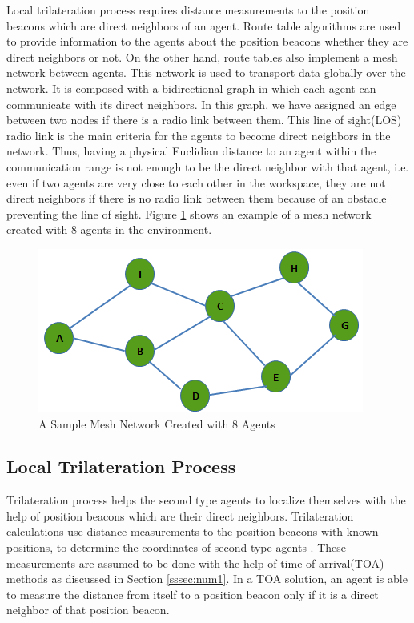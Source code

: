 Local trilateration process requires distance measurements to the position beacons which are direct neighbors of an agent. Route table algorithms are used to provide information to the agents about the position beacons whether they are direct neighbors or not. On the other hand, route tables also implement a mesh network between agents. This network is used to transport data globally over the network. It is composed with a bidirectional graph in which each agent can communicate with its direct neighbors. In this graph, we have assigned an edge between two nodes if there is a radio link between them. This line of sight(LOS) radio link is the main criteria for the agents to become direct neighbors in the network. Thus, having a physical Euclidian distance to an agent within the communication range is not enough to be the direct neighbor with that agent, i.e. even if two agents are very close to each other in the workspace, they are not direct neighbors if there is no radio link between them because of an obstacle preventing the line of sight. Figure \ref{sample_mesh} shows an example of a mesh network created with 8 agents in the environment.

\begin{figure}[H]
\caption{A Sample Mesh Network Created with 8 Agents} \label{sample_mesh}
\centering
\includegraphics[scale = 0.58]{mesh}
\end{figure}
 
\subsection{Local Trilateration Process}
Trilateration process helps the second type agents to localize themselves with the help of position beacons which are their direct neighbors.  Trilateration calculations use distance measurements to the position beacons with known positions, to determine the coordinates of second type agents \cite{22}. These measurements are assumed to be done with the help of time of arrival(TOA) methods as discussed in Section \ref{sssec:num1}. In a TOA solution, an agent is able to measure the distance from itself to a position beacon only if it is a direct neighbor of that position beacon. 

